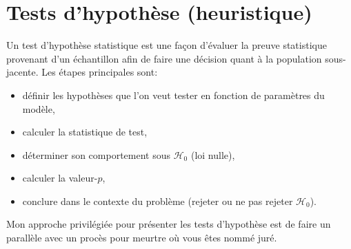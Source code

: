 \documentclass[
  11pt,
  letterpaper,
]{book}
\providecommand{\tightlist}{%
  \setlength{\itemsep}{0pt}\setlength{\parskip}{0pt}}
\begin{document}
\hypertarget{tests-dhypothuxe8se-heuristique}{%
\section{Tests d'hypothèse (heuristique)}\label{tests-dhypothuxe8se-heuristique}}

Un test d'hypothèse statistique est une façon d'évaluer la preuve statistique provenant d'un échantillon afin de faire une décision quant à la population sous-jacente. Les étapes principales sont:

\begin{itemize}
\tightlist
\item
  définir les hypothèses que l'on veut tester en fonction de paramètres du modèle,
\item
  calculer la statistique de test,
\item
  déterminer son comportement sous \(\mathscr{H}_0\) (loi nulle),
\item
  calculer la valeur-\(p\),
\item
  conclure dans le contexte du problème (rejeter ou ne pas rejeter \(\mathscr{H}_0\)).
\end{itemize}

Mon approche privilégiée pour présenter les tests d'hypothèse est de faire un parallèle avec un procès pour meurtre où vous êtes nommé juré.
\end{document}
